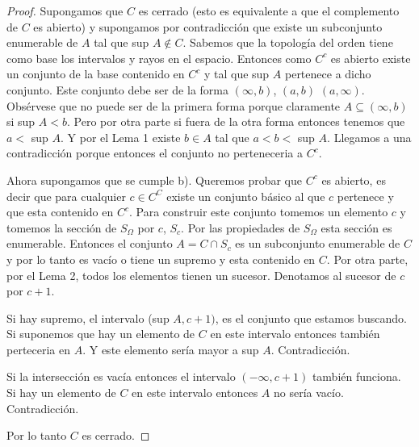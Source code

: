 \documentclass[letter,twoside,11pt]{article}
\begin{document}
\begin{enumerate}
\begin{proof}
Supongamos que $C$ es cerrado (esto es equivalente a que el complemento de $C$ es abierto) y supongamos por contradicci\'on que existe un subconjunto enumerable de $A$ tal que sup $A \not \in C$. Sabemos que la topolog\'ia del orden tiene como base los intervalos y rayos en el espacio. Entonces como $C^c$ es abierto existe un conjunto de la base contenido en $C^c$ y tal que sup $A$ pertenece a dicho conjunto. Este conjunto debe ser de la forma $(\infty,b)$, $(a,b)$ $(a, \infty)$. Obs\'ervese que no puede ser de la primera forma porque claramente $A \subseteq (\infty,b)$ si sup $A < b$. Pero por otra parte si fuera de la otra forma entonces tenemos que $a<$ sup $A$. Y por el Lema 1 existe $b \in A$ tal que $a<b<$ sup $A$. Llegamos a una contradicci\'on porque entonces el conjunto no perteneceria a $C^c$.

Ahora supongamos que se cumple b). Queremos probar que $C^c$ es abierto, es decir que para cualquier $c\in C^C$ existe un conjunto b\'asico al que $c$ pertenece y que esta contenido en $C^c$. Para construir este conjunto tomemos un elemento $c$ y tomemos la secci\'on de $S_{\Omega}$ por $c$, $S_c$. Por las propiedades de $S_{\Omega}$ esta secci\'on es enumerable. Entonces el conjunto $A= C \cap S_c$ es un subconjunto enumerable de $C$ y por lo tanto es vac\'io o tiene un supremo y esta contenido en $C$. Por otra parte, por el Lema 2, todos los elementos tienen un sucesor. Denotamos al sucesor de $c$ por $c+1$. 

Si hay supremo, el intervalo (sup $A, c+1)$, es el conjunto que estamos buscando. Si suponemos que hay un elemento de $C$ en este intervalo entonces tambi\'en perteceria en $A$. Y este elemento ser\'ia mayor a sup $A$. Contradicci\'on.

Si la intersecci\'on es vac\'ia entonces el intervalo $(-\infty, c+1)$ tambi\'en funciona. Si hay un elemento de $C$ en este intervalo entonces $A$ no ser\'ia vac\'io. Contradicci\'on.

Por lo tanto $C$ es cerrado.
\end{proof}


\end{enumerate}
\end{document}
